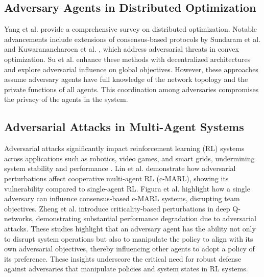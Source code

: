 \documentclass[journal]{IEEEtran}
\begin{document}
    
\subsection{Adversary Agents in Distributed Optimization}
Yang et al. \cite{yang2019survey} provide a comprehensive survey on distributed optimization. Notable advancements include extensions of consensus-based protocols by Sundaram et al. \cite{sundaram2018distributed} and Kuwaranancharoen et al. \cite{kuwaranancharoen2020byzantine}, which address adversarial threats in convex optimization. Su et al. \cite{su2020byzantine} enhance these methods with decentralized architectures and explore adversarial influence on global objectives. However, these approaches assume adversary agents have full knowledge of the network topology and the private functions of all agents. This coordination among adversaries compromises the privacy of the agents in the system.

\subsection{Adversarial Attacks in Multi-Agent Systems}
Adversarial attacks significantly impact reinforcement learning (RL) systems across applications such as robotics, video games, and smart grids, undermining system stability and performance \cite{guesmi2023physical, ali2023survey}. Lin et al. \cite{lin2020robustness} demonstrate how adversarial perturbations affect cooperative multi-agent RL (c-MARL), showing its vulnerability compared to single-agent RL. Figura et al. \cite{figura2021adversarial} highlight how a single adversary can influence consensus-based c-MARL systems, disrupting team objectives. Zheng et al. \cite{zheng2021vulnerability} introduce criticality-based perturbations in deep Q-networks, demonstrating substantial performance degradation due to adversarial attacks. These studies highlight that an adversary agent has the ability not only to disrupt system operations but also to manipulate the policy to align with its own adversarial objectives, thereby influencing other agents to adopt a policy of its preference. These insights underscore the critical need for robust defense against adversaries that manipulate policies and system states in RL systems.
\end{document}
